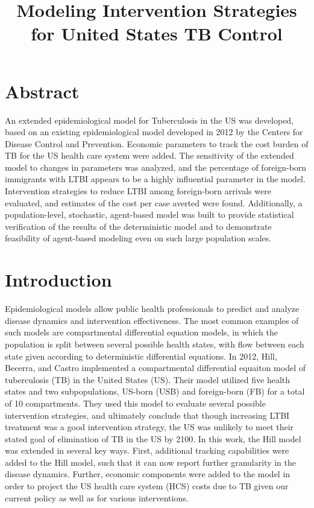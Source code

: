 \documentclass{amsart}
\title{Modeling Intervention Strategies for United States TB Control}
\begin{document}
\maketitle

\section{Abstract}
An extended epidemiological model for Tuberculosis in the US was developed,
based on an existing epidemiological model developed in 2012 by the Centers for
Disease Control and Prevention.  Economic parameters to track the cost burden of
TB for the US health care system were added.  The sensitivity of the extended
model to changes in parameters was analyzed, and the percentage of foreign-born
immigrants with LTBI appears to be a highly influential parameter in the model.
Intervention strategies to reduce LTBI among foreign-born arrivals were
evaluated, and estimates of the cost per case averted were found. Additionally,
a population-level, stochastic, agent-based model was built to provide
statistical verification of the results of the deterministic model and to
demonstrate feasibility of agent-based modeling even on such large population
scales. 

\section{Introduction}
Epidemiological models allow public health professionals to predict and analyze
disease dynamics and intervention effectiveness. The most common examples of
such models are compartmental differential equation models, in which the
population is split between several possible health states, with flow between
each state given according to deterministic differential equations. In 2012, 
Hill, Becerra, and Castro implemented a compartmental
differential equaiton model of tuberculosis (TB) in the United States (US).
Their model utilized five health states and two subpopulations, US-born (USB)
and foreign-born (FB) for a total of 10 compartments. They used this model to
evaluate several possible intervention strategies, and ultimately conclude that
though increasing LTBI treatment was a good intervention strategy, the US was
unlikely to meet their stated goal of elimination of TB in the US by 2100. In
this work, the Hill model was extended in several key ways. First, additional
tracking capabilities were added to the Hill model, such that it can now report
further granularity in the disease dynamics. Further, economic components were
added to the model in order to project the US health care system (HCS) costs due
to TB given our current policy as well as for various interventions. 
\end{document}
